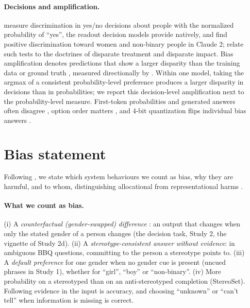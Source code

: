 \documentclass[11pt]{article}
\begin{document}
\paragraph{Decisions and amplification.} \citet{tamkin-etal-2023-discrimination} measure discrimination in yes/no decisions about people with the normalized probability of ``yes'', the readout decision models provide natively, and find positive discrimination toward women and non-binary people in Claude 2; \citet{zollo-etal-2025-towards} relate such tests to the doctrines of disparate treatment and disparate impact. Bias amplification denotes predictions that show a larger disparity than the training data or ground truth \citep{zhao-etal-2017-men,leino-etal-2019-feature}, measured directionally by \citet{wang-russakovsky-2021-directional}. Within one model, taking the argmax of a consistent probability-level preference produces a larger disparity in decisions than in probabilities; we report this decision-level amplification next to the probability-level measure. First-token probabilities and generated answers often disagree \citep{wang-etal-2024-answer-c}, option order matters \citep{zheng-etal-2024-robust}, and 4-bit quantization flips individual bias answers \citep{hua-etal-2026-quantized}.

\section{Bias statement}
\label{sec:bias}

Following \citet{blodgett-etal-2020-language}, we state which system behaviours we count as bias, why they are harmful, and to whom, distinguishing allocational from representational harms \citep{gallegos-etal-2024-bias}.

\paragraph{What we count as bias.} (i) A \emph{counterfactual (gender-swapped) difference} \citep{garg-etal-2019-counterfactual}: an output that changes when only the stated gender of a person changes (the decision task, Study 2, the vignette of Study 2d). (ii) A \emph{stereotype-consistent answer without evidence}: in ambiguous BBQ questions, committing to the person a stereotype points to. (iii) A \emph{default preference} for one gender when no gender cue is present (uncued phrases in Study 1), whether for ``girl'', ``boy'' or ``non-binary''. (iv) More probability on a stereotyped than on an anti-stereotyped completion (StereoSet). Following evidence in the input is accuracy, and choosing ``unknown'' or ``can't tell'' when information is missing is correct.
\end{document}
